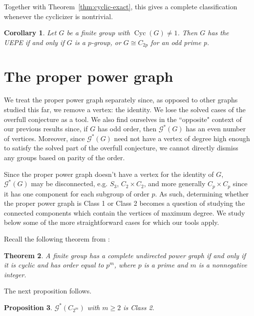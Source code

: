\documentclass{article}
\newtheorem{theorem}{Theorem}[section]
\newtheorem{proposition}[theorem]{Proposition}
\newtheorem{corollary}[theorem]{Corollary}
\theoremstyle{definition}
\theoremstyle{indentclaim}
\theoremstyle{named}
\theoremstyle{named}
\begin{document}
Together with Theorem~\ref{thm:cyclic-exact}, this gives a
complete classification whenever the cyclicizer is nontrivial.

\begin{corollary}
\label{cor:cyclicizer-exact}
Let \(G\) be a finite group with \(\operatorname{Cyc}(G)\ne1\).  Then \(G\)
has the UEPE if and only if $G$ is a $p$-group, or
 $G\cong C_{2p}$ for an odd prime p.
\end{corollary}


\section{The proper power graph}\label{sec:proper}


We treat the proper power graph separately since, as opposed to other graphs studied this far, we remove a vertex: the identity. We lose the solved cases of the overfull conjecture as a tool. We also find ourselves in the ``opposite" context of our previous results since, if $G$ has odd order, then $\mathscr{G}^*(G)$ has an even number of vertices. Moreover, since $\mathscr{G}^*(G)$ need not have a vertex of degree high enough to satisfy the solved part of the overfull conjecture, we cannot directly dismiss any groups based on parity of the order. 


Since the proper power graph doesn't have a vertex for the identity of $G$, $\mathscr{G}^*(G)$ may be disconnected, e.g. $S_3$, $C_2 \times C_2$, and more generally $C_p \times C_p$ since it has one component for each subgroup of order $p$. As such, determining whether the proper power graph is Class 1 or Class 2 becomes a question of studying the connected components which contain the vertices of maximum degree. We study below some of the more straightforward cases for which our tools apply. 

\bigskip

Recall the following theorem from \cite{C-G-S}: 

\begin{theorem}
    A finite group has a complete undirected power graph if and only if it is cyclic and has order equal to $p^m$, where $p$ is a prime and $m$ is a nonnegative integer. 
\end{theorem}

The next proposition follows. 

\begin{proposition}\label{prop:c2m}
    $\mathscr{G}^*(C_{2^m})$ with $m\geq 2$ is Class 2. 
\end{proposition}
\end{document}

